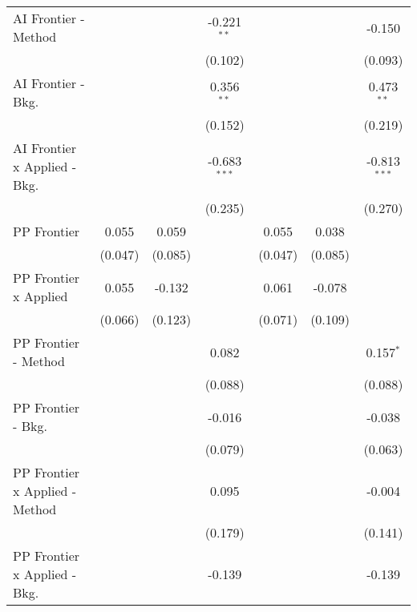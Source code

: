 \begin{tabular}{lcccccc}
   AI Frontier - Method           &         &              & -0.221$^{**}$  &         &                & -0.150\\   
                                  &         &              & (0.102)        &         &                & (0.093)\\   
   AI Frontier - Bkg.             &         &              & 0.356$^{**}$   &         &                & 0.473$^{**}$\\   
                                  &         &              & (0.152)        &         &                & (0.219)\\   
   AI Frontier x Applied - Bkg.   &         &              & -0.683$^{***}$ &         &                & -0.813$^{***}$\\   
                                  &         &              & (0.235)        &         &                & (0.270)\\   
   PP Frontier                    & 0.055   & 0.059        &                & 0.055   & 0.038          &   \\   
                                  & (0.047) & (0.085)      &                & (0.047) & (0.085)        &   \\   
   PP Frontier x Applied          & 0.055   & -0.132       &                & 0.061   & -0.078         &   \\   
                                  & (0.066) & (0.123)      &                & (0.071) & (0.109)        &   \\   
   PP Frontier - Method           &         &              & 0.082          &         &                & 0.157$^{*}$\\   
                                  &         &              & (0.088)        &         &                & (0.088)\\   
   PP Frontier - Bkg.             &         &              & -0.016         &         &                & -0.038\\   
                                  &         &              & (0.079)        &         &                & (0.063)\\   
   PP Frontier x Applied - Method &         &              & 0.095          &         &                & -0.004\\   
                                  &         &              & (0.179)        &         &                & (0.141)\\   
   PP Frontier x Applied - Bkg.   &         &              & -0.139         &         &                & -0.139\\   

\end{tabular}
